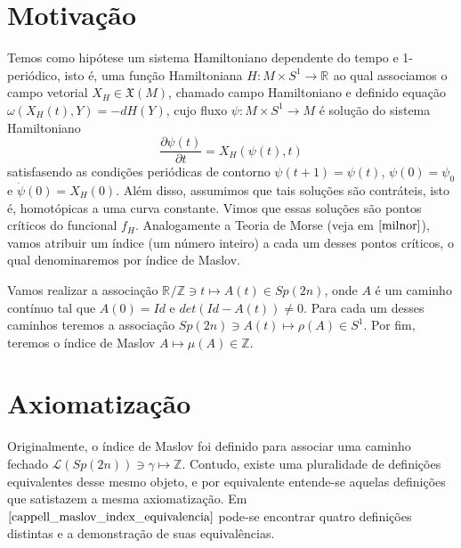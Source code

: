 \documentclass[12pt]{book}
\newcommand{\caminhos}{\mathcal{L}}
\newcommand{\caminhossempontobase}[1]{\caminhos(#1)}
\newcommand{\campohamiltoniano}[1]{X_{H}(#1)}
\newcommand{\campossuaves}[1]{\mathfrak{X}(#1)}
\newcommand{\circulo}{S^{1}}
\newcommand{\derivadaparcial}[2]{\frac{\partial #1}{\partial #2}}
\newcommand{\formaSimpletica}[2]{\omega(#1, #2)}
\newcommand{\gruposimpletico}[1]{Sp(#1)}
\newcommand{\inteiros}{\mathbb{Z}}
\newcommand{\real}[1]{\mathbb{R}^{#1}}
\newcommand{\reta}{\real{}}
\begin{document}
	\section{Motivação}
	Temos como hipótese um sistema Hamiltoniano dependente do tempo e 1-periódico, isto é, uma função Hamiltoniana $H:M\times \circulo \to \reta$ ao qual associamos o campo vetorial $X_{H} \in \campossuaves{M}$, chamado campo Hamiltoniano e definido equação $\formaSimpletica{\campohamiltoniano{t}}{Y} = -dH(Y)$, cujo fluxo $\psi:M\times \circulo \to M$ é solução do sistema Hamiltoniano
	$$
	\derivadaparcial{\psi(t)}{t} = X_{H}(\psi(t), t)
	$$
	satisfasendo as condições periódicas de contorno $\psi(t+1) = \psi(t)$, $\psi(0) = \psi_{0}$ e $\dot{\psi}(0) = \campohamiltoniano{0}$. Além disso, assumimos que tais soluções são contráteis, isto é, homotópicas a uma curva constante. Vimos que essas soluções são pontos críticos do funcional $f_{H}$. Analogamente a Teoria de Morse (veja em $\cite{milnor}$), vamos atribuir um índice (um número inteiro) a cada um desses pontos críticos, o qual denominaremos por índice de Maslov.
	
	Vamos realizar a associação $\reta/\mathbb{Z} \ni t \mapsto A(t) \in \gruposimpletico{2n}$, onde $A$ é um caminho contínuo tal que $A(0) = Id$ e $det(Id - A(t))\neq 0$. Para cada um desses caminhos teremos a associação $\gruposimpletico{2n} \ni A(t) \mapsto \rho(A) \in \circulo$. Por fim, teremos o índice de Maslov $A \mapsto \mu(A) \in \inteiros$.
	
	\section{Axiomatização}
	
	Originalmente, o índice de Maslov foi definido para associar uma caminho fechado $\caminhossempontobase{\gruposimpletico{2n}} \ni \gamma \mapsto \inteiros$. Contudo, existe uma pluralidade de definições equivalentes desse mesmo objeto, e por equivalente entende-se aquelas definições que satistazem a mesma axiomatização. Em $\cite{cappell_maslov_index_equivalencia}$ pode-se encontrar quatro definições distintas e a demonstração de suas equivalências.
	
\end{document}
